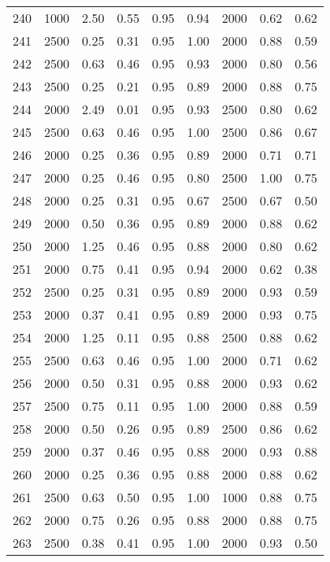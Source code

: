 \begin{longtable}[c]{ccccccccc}
240 &  1000 &  2.50 &  0.55 &  0.95 &  0.94 &  2000 &  0.62 &  0.62 \\
241 &  2500 &  0.25 &  0.31 &  0.95 &  1.00 &  2000 &  0.88 &  0.59 \\
242 &  2500 &  0.63 &  0.46 &  0.95 &  0.93 &  2000 &  0.80 &  0.56 \\
243 &  2500 &  0.25 &  0.21 &  0.95 &  0.89 &  2000 &  0.88 &  0.75 \\
244 &  2000 &  2.49 &  0.01 &  0.95 &  0.93 &  2500 &  0.80 &  0.62 \\
245 &  2500 &  0.63 &  0.46 &  0.95 &  1.00 &  2500 &  0.86 &  0.67 \\
246 &  2000 &  0.25 &  0.36 &  0.95 &  0.89 &  2000 &  0.71 &  0.71 \\
247 &  2000 &  0.25 &  0.46 &  0.95 &  0.80 &  2500 &  1.00 &  0.75 \\
248 &  2000 &  0.25 &  0.31 &  0.95 &  0.67 &  2500 &  0.67 &  0.50 \\
249 &  2000 &  0.50 &  0.36 &  0.95 &  0.89 &  2000 &  0.88 &  0.62 \\
250 &  2000 &  1.25 &  0.46 &  0.95 &  0.88 &  2000 &  0.80 &  0.62 \\
251 &  2000 &  0.75 &  0.41 &  0.95 &  0.94 &  2000 &  0.62 &  0.38 \\
252 &  2500 &  0.25 &  0.31 &  0.95 &  0.89 &  2000 &  0.93 &  0.59 \\
253 &  2000 &  0.37 &  0.41 &  0.95 &  0.89 &  2000 &  0.93 &  0.75 \\
254 &  2000 &  1.25 &  0.11 &  0.95 &  0.88 &  2500 &  0.88 &  0.62 \\
255 &  2500 &  0.63 &  0.46 &  0.95 &  1.00 &  2000 &  0.71 &  0.62 \\
256 &  2000 &  0.50 &  0.31 &  0.95 &  0.88 &  2000 &  0.93 &  0.62 \\
257 &  2500 &  0.75 &  0.11 &  0.95 &  1.00 &  2000 &  0.88 &  0.59 \\
258 &  2000 &  0.50 &  0.26 &  0.95 &  0.89 &  2500 &  0.86 &  0.62 \\
259 &  2000 &  0.37 &  0.46 &  0.95 &  0.88 &  2000 &  0.93 &  0.88 \\
260 &  2000 &  0.25 &  0.36 &  0.95 &  0.88 &  2000 &  0.88 &  0.62 \\
261 &  2500 &  0.63 &  0.50 &  0.95 &  1.00 &  1000 &  0.88 &  0.75 \\
262 &  2000 &  0.75 &  0.26 &  0.95 &  0.88 &  2000 &  0.88 &  0.75 \\
263 &  2500 &  0.38 &  0.41 &  0.95 &  1.00 &  2000 &  0.93 &  0.50 \\

\end{longtable}
